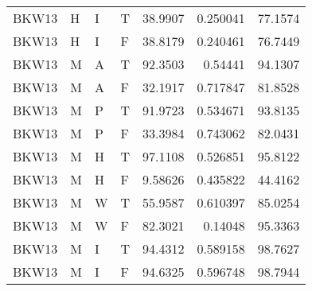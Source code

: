\begin{table}[!htb]
{\begin{tabular}{llllrrr}
            BKW13    & H     & I     & T          & 38.9907    & 0.250041  & 77.1574  \\
            BKW13    & H     & I     & F          & 38.8179    & 0.240461  & 76.7449  \\
            BKW13    & M     & A     & T          & 92.3503    & 0.54441   & 94.1307  \\
            BKW13    & M     & A     & F          & 32.1917    & 0.717847  & 81.8528  \\
            BKW13    & M     & P     & T          & 91.9723    & 0.534671  & 93.8135  \\
            BKW13    & M     & P     & F          & 33.3984    & 0.743062  & 82.0431  \\
            BKW13    & M     & H     & T          & 97.1108    & 0.526851  & 95.8122  \\
            BKW13    & M     & H     & F          & 9.58626    & 0.435822  & 44.4162  \\
            BKW13    & M     & W     & T          & 55.9587    & 0.610397  & 85.0254  \\
            BKW13    & M     & W     & F          & 82.3021    & 0.14048   & 95.3363  \\
            BKW13    & M     & I     & T          & 94.4312    & 0.589158  & 98.7627  \\
            BKW13    & M     & I     & F          & 94.6325    & 0.596748  & 98.7944  \\
            \hline
        \end{tabular}
    }{}
\end{table}